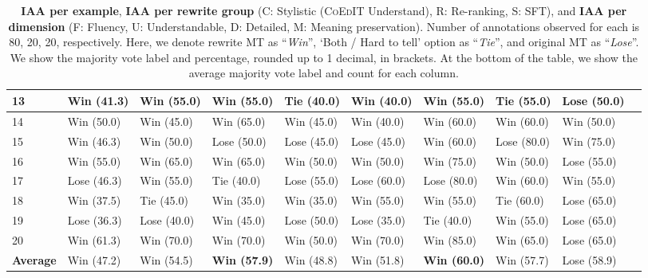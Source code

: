 \begin{table*}[!htp]
{\begin{tabular}{l | l l l l l l l l l}
    13 & Win (41.3) & Win (55.0) & Win (55.0) & Tie (40.0) & Win (40.0) & Win (55.0) & Tie (55.0) & Lose (50.0) \\ \midrule
    14 & Win (50.0) & Win (45.0) & Win (65.0) & Win (45.0) & Win (40.0) & Win (60.0) & Win (60.0) & Win (50.0)\\ \midrule
    15 & Win (46.3) & Win (50.0) & Lose (50.0) & Lose (45.0) & Lose (45.0) & Win (60.0) & Lose (80.0) & Win (75.0) \\ \midrule
    16 & Win (55.0) & Win (65.0) & Win (65.0) & Win (50.0) & Win (50.0) & Win (75.0) & Win (50.0) & Lose (55.0) \\ \midrule
    17 & Lose (46.3) & Win (55.0) & Tie (40.0) & Lose (55.0) & Lose (60.0) & Lose (80.0) & Win (60.0) & Win (55.0)\\ \midrule
    18 & Win (37.5) & Tie (45.0) & Win (35.0) & Win (35.0) & Win (55.0) & Win (55.0) & Tie (60.0) & Lose (65.0)\\ \midrule
    19 & Lose (36.3) & Lose (40.0) & Win (45.0) & Lose (50.0) & Lose (35.0) & Tie (40.0) & Win (55.0) & Lose (65.0)\\ \midrule
    20 & Win (61.3) & Win (70.0) & Win (70.0) & Win (50.0) & Win (70.0) & Win (85.0) & Win (65.0) & Lose (65.0)\\ \midrule\midrule
    \textbf{Average} & Win (47.2) & Win (54.5) & \textbf{Win (57.9)} & Win (48.8) & Win (51.8) & \textbf{Win (60.0)} & Win (57.7) & Lose (58.9) \\
    
    \bottomrule
    \end{tabular}
}
\caption{\textbf{IAA per example}, \textbf{IAA per rewrite group} (C: Stylistic (\textsc{CoEdIT} Understand), R: Re-ranking, S: SFT), and \textbf{IAA per dimension} (F: Fluency, U: Understandable, D: Detailed, M: Meaning preservation). Number of annotations observed for each is 80, 20, 20, respectively. Here, we denote rewrite MT as ``\textit{Win}'', `Both / Hard to tell' option as ``\textit{Tie}'', and original MT as ``\textit{Lose}''. We show the majority vote label and percentage, rounded up to 1 decimal, in brackets. At the bottom of the table, we show the average majority vote label and count for each column.}
\label{tab:iaa}
\end{table*}
